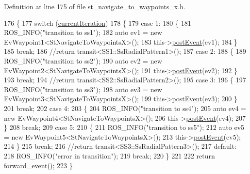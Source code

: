 Definition at line 175 of file st\+\_\+navigate\+\_\+to\+\_\+waypoints\+\_\+x.\+h.


\begin{DoxyCode}
176   \{
177     \textcolor{keywordflow}{switch} (\hyperlink{structsm__dance__bot_1_1StNavigateToWaypointsX_ac282dc1978f30ad53499dbfddd80ecdc}{currentIteration})
178     \{
179     \textcolor{keywordflow}{case} 1:
180     \{
181       ROS\_INFO(\textcolor{stringliteral}{"transition to ss1"});
182       \textcolor{keyword}{auto} ev1 = \textcolor{keyword}{new} EvWaypoint1<StNavigateToWaypointsX>();
183       this->\hyperlink{classsmacc_1_1ISmaccState_acef404ab3766ddf2892e8dad14a4a7cf}{postEvent}(ev1);
184     \}
185     \textcolor{keywordflow}{break};
186       \textcolor{comment}{//return transit<SS1::SsRadialPattern1>();}
187     \textcolor{keywordflow}{case} 2:
188     \{
189       ROS\_INFO(\textcolor{stringliteral}{"transition to ss2"});
190       \textcolor{keyword}{auto} ev2 = \textcolor{keyword}{new} EvWaypoint2<StNavigateToWaypointsX>();
191       this->\hyperlink{classsmacc_1_1ISmaccState_acef404ab3766ddf2892e8dad14a4a7cf}{postEvent}(ev2);
192     \}
193     \textcolor{keywordflow}{break};
194       \textcolor{comment}{//return transit<SS2::SsRadialPattern2>();}
195     \textcolor{keywordflow}{case} 3:
196     \{
197       ROS\_INFO(\textcolor{stringliteral}{"transition to ss3"});
198       \textcolor{keyword}{auto} ev3 = \textcolor{keyword}{new} EvWaypoint3<StNavigateToWaypointsX>();
199       this->\hyperlink{classsmacc_1_1ISmaccState_acef404ab3766ddf2892e8dad14a4a7cf}{postEvent}(ev3);
200     \}
201     \textcolor{keywordflow}{break};
202     \textcolor{keywordflow}{case} 4:
203     \{
204       ROS\_INFO(\textcolor{stringliteral}{"transition to ss4"});
205       \textcolor{keyword}{auto} ev4 = \textcolor{keyword}{new} EvWaypoint4<StNavigateToWaypointsX>();
206       this->\hyperlink{classsmacc_1_1ISmaccState_acef404ab3766ddf2892e8dad14a4a7cf}{postEvent}(ev4);
207     \}
208     \textcolor{keywordflow}{break};
209     \textcolor{keywordflow}{case} 5:
210     \{
211       ROS\_INFO(\textcolor{stringliteral}{"transition to ss5"});
212       \textcolor{keyword}{auto} ev5 = \textcolor{keyword}{new} EvWaypoint5<StNavigateToWaypointsX>();
213       this->\hyperlink{classsmacc_1_1ISmaccState_acef404ab3766ddf2892e8dad14a4a7cf}{postEvent}(ev5);
214     \}
215     \textcolor{keywordflow}{break};
216       \textcolor{comment}{//return transit<SS3::SsRadialPattern3>();}
217     \textcolor{keywordflow}{default}:
218       ROS\_INFO(\textcolor{stringliteral}{"error in transition"});
219       \textcolor{keywordflow}{break};
220     \}
221 
222     \textcolor{keywordflow}{return} forward\_event();
223   \}
\end{DoxyCode}
